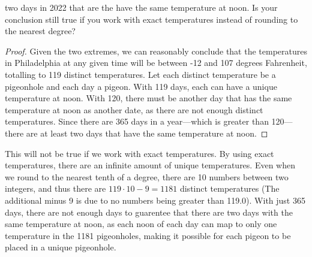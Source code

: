 \documentclass[article, 12pt]{article}
\theoremstyle{definition}
\begin{document}
\begin{enumerate}[(1)]
{        two days in 2022 that are the have the same temperature at noon. Is your conclusion still
        true if you work with exact temperatures instead of rounding to the nearest degree?}
        \begin{proof}
            Given the two extremes, we can reasonably conclude that the temperatures in Philadelphia at any given time will be between -12 and 107 degrees Fahrenheit, totalling to 119 distinct temperatures. Let each distinct temperature be a pigeonhole and each day a pigeon. With 119 days, each can have a unique temperature at noon. With 120, there must be another day that has the same temperature at noon as another date, as there are not enough distinct temperatures. Since there are 365 days in a year---which is greater than 120---there are at least two days that have the same temperature at noon.
        \end{proof}
        This will not be true if we work with exact temperatures. By using exact temperatures, there are an infinite amount of unique temperatures. Even when we round to the nearest tenth of a degree, there are 10 numbers between two integers, and thus there are $119 \cdot 10-9=1181$ distinct temperatures (The additional minus 9 is due to no numbers being greater than 119.0). With just 365 days, there are not enough days to guarentee that there are two days with the same temperature at noon, as each noon of each day can map to only one temperature in the 1181 pigeonholes, making it possible for each pigeon to be placed in a unique pigeonhole.
    \end{enumerate}
\end{document}
